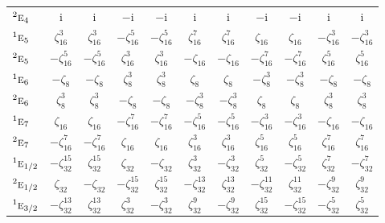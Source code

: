 \documentclass[10pt,a4paper]{article}
\makeatletter
\def\grouprule#1#2{\noalign{\marks\LTgroupmarks{\the\belowrulesep}\nobreak\vskip#1%
  \vskip\aboverulesep}\multispan\LT@cols\unskip{\leaders\hrule\@height#2\hfill\kern\z@}\cr
  \noalign{\penalty\LTrulebreak\vskip\belowrulesep\global\@lastruleclass\z@}}
\numberwithin{equation}{section}
\newcommand{\irr}[1]{\text{\normalfont\scshape #1}}
\newcommand{\conjpair}[1]{{}^{#1}}
\newcommand{\iunit}{\mathrm{i}}
\newcommand{\rootunity}[1]{\zeta_{#1}}
\makeatother
\begin{document}
{\begin{longtable}{@{}lcccccccccc@{}}
$\conjpair{2}\irr{e}_{4}$ & $\iunit{}$ & $\iunit{}$ & $-\iunit{}$ & $-\iunit{}$ & $\iunit{}$ & $\iunit{}$ & $-\iunit{}$ & $-\iunit{}$ & $\iunit{}$ & $\iunit{}$\\
$\conjpair{1}\irr{e}_{5}$ & $\rootunity{16}^{3}$ & $\rootunity{16}^{3}$ & $-\rootunity{16}^{5}$ & $-\rootunity{16}^{5}$ & $\rootunity{16}^{7}$ & $\rootunity{16}^{7}$ & $\rootunity{16}$ & $\rootunity{16}$ & $-\rootunity{16}^{3}$ & $-\rootunity{16}^{3}$\\
$\conjpair{2}\irr{e}_{5}$ & $-\rootunity{16}^{5}$ & $-\rootunity{16}^{5}$ & $\rootunity{16}^{3}$ & $\rootunity{16}^{3}$ & $-\rootunity{16}$ & $-\rootunity{16}$ & $-\rootunity{16}^{7}$ & $-\rootunity{16}^{7}$ & $\rootunity{16}^{5}$ & $\rootunity{16}^{5}$\\
$\conjpair{1}\irr{e}_{6}$ & $-\rootunity{8}$ & $-\rootunity{8}$ & $\rootunity{8}^{3}$ & $\rootunity{8}^{3}$ & $\rootunity{8}$ & $\rootunity{8}$ & $-\rootunity{8}^{3}$ & $-\rootunity{8}^{3}$ & $-\rootunity{8}$ & $-\rootunity{8}$\\
$\conjpair{2}\irr{e}_{6}$ & $\rootunity{8}^{3}$ & $\rootunity{8}^{3}$ & $-\rootunity{8}$ & $-\rootunity{8}$ & $-\rootunity{8}^{3}$ & $-\rootunity{8}^{3}$ & $\rootunity{8}$ & $\rootunity{8}$ & $\rootunity{8}^{3}$ & $\rootunity{8}^{3}$\\
$\conjpair{1}\irr{e}_{7}$ & $\rootunity{16}$ & $\rootunity{16}$ & $-\rootunity{16}^{7}$ & $-\rootunity{16}^{7}$ & $-\rootunity{16}^{5}$ & $-\rootunity{16}^{5}$ & $-\rootunity{16}^{3}$ & $-\rootunity{16}^{3}$ & $-\rootunity{16}$ & $-\rootunity{16}$\\
$\conjpair{2}\irr{e}_{7}$ & $-\rootunity{16}^{7}$ & $-\rootunity{16}^{7}$ & $\rootunity{16}$ & $\rootunity{16}$ & $\rootunity{16}^{3}$ & $\rootunity{16}^{3}$ & $\rootunity{16}^{5}$ & $\rootunity{16}^{5}$ & $\rootunity{16}^{7}$ & $\rootunity{16}^{7}$\\
\grouprule{0pt}{\lightrulewidth}
$\conjpair{1}\irr{e}_{1/2}$ & $-\rootunity{32}^{15}$ & $\rootunity{32}^{15}$ & $\rootunity{32}$ & $-\rootunity{32}$ & $\rootunity{32}^{3}$ & $-\rootunity{32}^{3}$ & $\rootunity{32}^{5}$ & $-\rootunity{32}^{5}$ & $\rootunity{32}^{7}$ & $-\rootunity{32}^{7}$\\
$\conjpair{2}\irr{e}_{1/2}$ & $\rootunity{32}$ & $-\rootunity{32}$ & $-\rootunity{32}^{15}$ & $\rootunity{32}^{15}$ & $-\rootunity{32}^{13}$ & $\rootunity{32}^{13}$ & $-\rootunity{32}^{11}$ & $\rootunity{32}^{11}$ & $-\rootunity{32}^{9}$ & $\rootunity{32}^{9}$\\
$\conjpair{1}\irr{e}_{3/2}$ & $-\rootunity{32}^{13}$ & $\rootunity{32}^{13}$ & $\rootunity{32}^{3}$ & $-\rootunity{32}^{3}$ & $\rootunity{32}^{9}$ & $-\rootunity{32}^{9}$ & $\rootunity{32}^{15}$ & $-\rootunity{32}^{15}$ & $-\rootunity{32}^{5}$ & $\rootunity{32}^{5}$\\

\end{longtable}}
\end{document}

